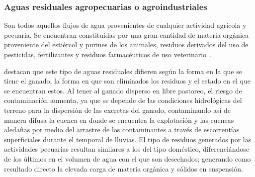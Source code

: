 \subsubsection{Aguas residuales agropecuarias o agroindustriales}
Son todos aquellos flujos de agua provenientes de cualquier actividad agrícola y pecuaria. Se encuentran constituidas por una gran cantidad de materia orgánica proveniente del estiércol y purines de los animales, residuos derivados del uso de pesticidas, fertilizantes y residuos farmacéuticos de uso veterinario~\citep{lazcano2016}.\par
\cite{zambrano2009} destacan que este tipo de aguas residuales difieren según la forma en la que se tiene el ganado, la forma en que son eliminados los residuos y el estado en el que se encuentran estos. Al tener al ganado disperso en libre pastoreo, el riesgo de contaminación aumenta, ya que se depende de las condiciones hidrológicas del terreno para la dispersión de las excretas del ganado, contaminando así de manera difusa la cuenca en donde se encuentra la explotación y las cuencas aledañas por medio del arrastre de los contaminantes a través de escorrentías superficiales durante el temporal de lluvias.
El tipo de residuos generados por las actividades pecuarias resultan similares a los del tipo doméstico, diferenciándose de los últimos en el volumen de agua con el que son desechados; generando como resultado directo la elevada carga de materia orgánica y sólidos en suspensión.\par
